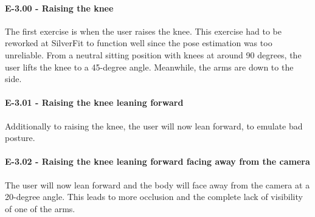 \paragraph{E-3.00 - Raising the knee}

The first exercise is when the user raises the knee. This exercise had to be reworked at SilverFit to function well since the pose estimation was too unreliable. From a neutral sitting position with knees at around 90 degrees, the user lifts the knee to a 45-degree angle. Meanwhile, the arms are down to the side.

\paragraph{E-3.01 - Raising the knee leaning forward}

Additionally to raising the knee, the user will now lean forward, to emulate bad posture.

\paragraph{E-3.02 - Raising the knee leaning forward facing away from the camera}

The user will now lean forward and the body will face away from the camera at a 20-degree angle. This leads to more occlusion and the complete lack of visibility of one of the arms. 